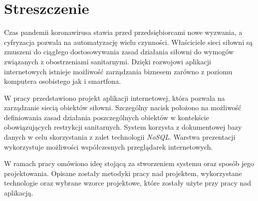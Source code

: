 \documentclass[a4paper,twoside,12pt]{book}
\newcounter{stronyPozaNumeracja}
\begin{document}
\setcounter{stronyPozaNumeracja}{\value{page}}
\mainmatter
\pagestyle{empty}

\chapter*{Streszczenie}

Czas pandemii koronawirusa stawia przed przedsiębiorcami nowe wyzwania, a cyfryzacja pozwala na automatyzację wielu czynności. Właściciele sieci siłowni są zmuszeni do ciągłego dostosowywania zasad działania siłowni do wymogów związanych z obostrzeniami sanitarnymi. Dzięki rozwojowi aplikacji internetowych istnieje możliwość zarządzania biznesem zarówno z poziomu komputera osobistego jak i smartfona.

W pracy przedstawiono projekt aplikacji internetowej, która pozwala na zarządzanie siecią obiektów siłowni. Szczególny nacisk położono na możliwość definiowania zasad działania poszczególnych obiektów w kontekście obowiązujących restrykcji sanitarnych. System korzysta z dokumentowej bazy danych w celu skorzystania z zalet technologii \textit{NoSQL}. Warstwa prezentacji wykorzystuje możliwości współczesnych przeglądarek internetowych.

W ramach pracy omówiono ideę stojącą za stworzeniem systemu oraz sposób jego projektowania. Opisane zostały metodyki pracy nad projektem, wykorzystane technologie oraz wybrane wzorce projektowe, które zostały użyte przy pracy nad aplikacją.
\end{document}
